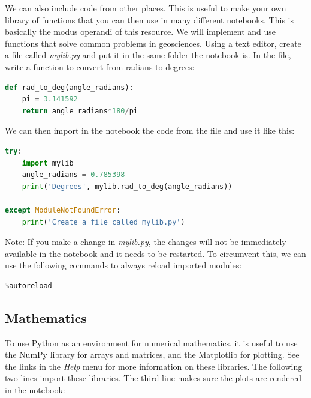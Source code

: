 \documentclass[a4paper , 12pt]{book}
\begin{document}
We can also include code from other places. This is useful to make your own library of functions that you can then use in many different notebooks. This is basically the modus operandi of this resource. We will implement and use functions that solve common problems in geosciences. Using a text editor, create a file called \textit{mylib.py} and put it in the same folder the notebook is. In the file, write a function to convert from radians to degrees:

\begin{center}
\begin{lstlisting}[language=Python, frame=single]
def rad_to_deg(angle_radians):
    pi = 3.141592
    return angle_radians*180/pi
\end{lstlisting}
\end{center}

We can then import in the notebook the code from the file and use it like this:

\begin{center}
\begin{lstlisting}[language=Python, frame=single]
try:
    import mylib
    angle_radians = 0.785398
    print('Degrees', mylib.rad_to_deg(angle_radians))
    
except ModuleNotFoundError:
    print('Create a file called mylib.py')
\end{lstlisting}
\end{center}

Note: If you make a change in \textit{mylib.py}, the changes will not be immediately available in the notebook and it needs to be restarted. To circumvent this, we can use the following commands to always reload imported modules:

\begin{center}
\begin{lstlisting}[language=Python, frame=single]
%load_ext autoreload
%autoreload
\end{lstlisting}   
\end{center}

\subsection{Mathematics}

To use Python as an environment for numerical mathematics, it is useful to use the NumPy library for arrays and matrices, and the Matplotlib for plotting. See the links in the \textit{Help} menu for more information on these libraries. The following two lines import these libraries. The third line makes sure the plots are rendered in the notebook:
\end{document}
